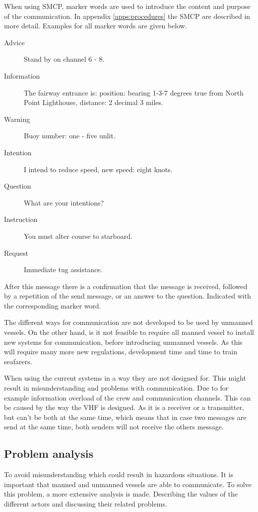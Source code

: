 When using \ac{SMCP}, marker words are used to introduce the content and purpose of the communication. In appendix \ref{apps:procedures} the \ac{SMCP} are described in more detail. Examples for all marker words are given below.
\begin{description}
	\item [Advice] Stand by on channel 6 - 8.
	\item [Information] The fairway entrance is: position: bearing 1-3-7 degrees true from North Point Lighthouse, distance: 2 decimal 3 miles.
	\item [Warning] Buoy number: one - five unlit.
	\item [Intention] I intend to reduce speed, new speed: eight knots.
	\item [Question] What are your intentions?
	\item [Instruction] You must alter course to starboard.
	\item [Request] Immediate tug assistance.
\end{description}
After this message there is a confirmation that the message is received, followed by a repetition of the send message, or an answer to the question. Indicated with the corresponding marker word.

The different ways for communication are not developed to be used by unmanned vessels. On the other hand, is it not feasible to require all manned vessel to install new systems for communication, before introducing unmanned vessels. As this will require many more new regulations, development time and time to train seafarers.

When using the current systems in a way they are not designed for. This might result in misunderstanding and problems with communication. Due to for example information overload of the crew and communication channels. This can be caused by the way the \ac{VHF} is designed. As it is a receiver or a transmitter, but can't be both at the same time, which means that in case two messages are send at the same time, both senders will not receive the others message.

\subsection{Problem analysis}
To avoid misunderstanding which could result in hazardous situations. It is important that manned and unmanned vessels are able to communicate. To solve this problem, a more extensive analysis is made. 
Describing the values of the different actors and discussing their related problems.

